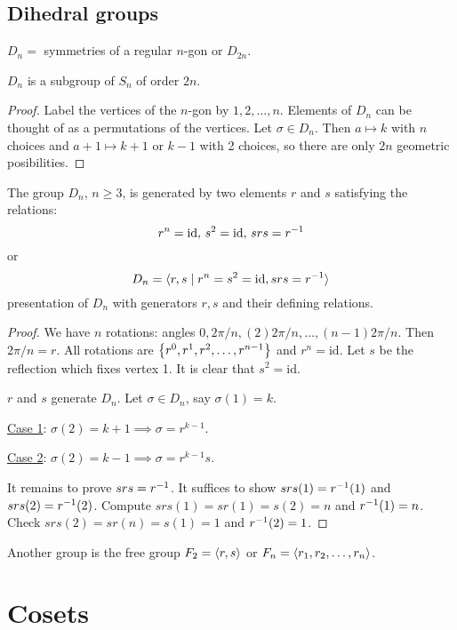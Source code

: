 \documentclass[]{article}
\begin{document}
\subsection{Dihedral groups}

$D_n =$ symmetries of a regular $n$-gon or $D_{2n}$.
\begin{theorem}
	$D_n$ is a subgroup of $S_n$ of order $2n$.
\end{theorem}
\begin{proof}
	Label the vertices of the $n$-gon by $1,2,\dots,n$. Elements of $D_n$ can be thought of as a permutations of the vertices.
	Let $\sigma\in D_n$. Then $a\mapsto k$ with $n$ choices and $a+1\mapsto k+1$ or $k-1$ with 2 choices, so there are only $2n$ geometric posibilities.
\end{proof}
\begin{theorem}
	The group $D_n$, $n\geq 3$, is generated by two elements $r$ and $s$ satisfying the relations: $$r^n = \text{id},\,s^2 = \text{id},\,srs = r^{-1}$$
	or $$ D_n =\langle r,s\mid r^n = s^2 = \text{id},srs = r^{-1} \rangle$$ presentation of $D_n$ with generators $r,s$ and their defining relations.
\end{theorem}
\begin{proof}
	We have $n$ rotations: angles $0,2\pi/n,(2)2\pi/n,\dots,(n-1)2\pi/n$. Then $2\pi/n = r$. All rotations are $\left\{ r^0,r^1,r^2,\dots,r^{n-1} \right\}$ and $r^n = \text{id}$.
	Let $s$ be the reflection which fixes vertex 1.
	It is clear that $s^2 = \text{id}$.
			
			$r$ and $s$ generate $D_n$. Let $\sigma\in D_n$, say $\sigma(1) = k$.
			
			\ul{Case 1}: $\sigma(2) = k+1 \implies \sigma = r^{k-1}$.
			
			\ul{Case 2}: $\sigma(2) = k-1 \implies \sigma = r^{k-1}s$.
	
	It remains to prove $srs = r^{-1}$. It suffices to show $srs(1) = r^{-1}(1)$ and $srs(2) = r^{-1}(2)$.
	Compute $srs(1) = sr(1) = s(2) = n$ and $r^{-1}(1) = n$.
	Check $srs(2) = sr(n) = s(1) = 1$ and $r^{-1}(2) = 1$.
\end{proof}
Another group is the free group $F_2 =\langle r,s \rangle$ or $F_n =\langle r_1,r_2,\dots,r_n \rangle$.

\section{Cosets}
\end{document}

